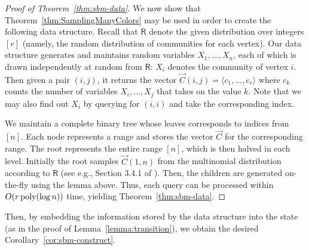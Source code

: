 \begin{proof}[Proof of Theorem~\ref{thm:sbm-data}]
We now show that Theorem~\ref{thm:SamplingManyColors} may be used in order to create the following data structure.
Recall that $\mathsf{R}$ denote the given distribution over integers $[r]$ (namely, the random distribution of communities for each vertex).
Our data structure generates and maintains random variables $X_1, \ldots, X_n$,
each of which is drawn independently at random from $\mathsf{R}$: $X_i$ denotes the community of vertex $i$.
Then given a pair $(i, j)$, it returns the vector $\vec{C}(i, j) = \langle c_1, \ldots, c_r \rangle$
where $c_k$ counts the number of variables $X_i, \ldots, X_j$ that takes on the value $k$.
Note that we may also find out $X_i$ by querying for $(i, i)$ and take the corresponding index.

We maintain a complete binary tree whose leaves corresponds to indices from $[n]$.
Each node represents a range and stores the vector $\vec{C}$ for the corresponding range.
The root represents the entire range $[n]$, which is then halved in each level.
Initially the root samples $\vec{C}(1, n)$ from the multinomial distribution according to $\mathsf{R}$
(see e.g., Section 3.4.1 of \cite{knuth}).
Then, the children are generated on-the-fly using the lemma above.
Thus, each query can be processed within $O(r\,\mathrm{poly}(\log n))$ time, yielding Theorem~\ref{thm:sbm-data}.
\end{proof}

Then, by embedding the information stored by the data structure into the state (as in the proof of Lemma~\ref{lemma:transition}),
we obtain the desired Corollary~\ref{cor:sbm-construct}.
